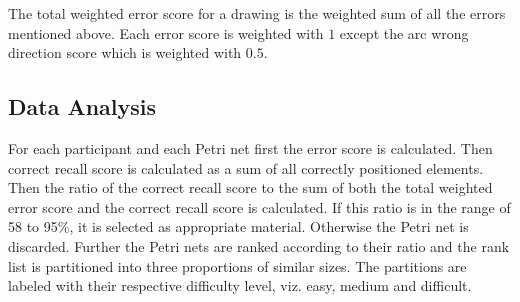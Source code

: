 The total weighted error score for a drawing is the weighted sum of all the errors mentioned above.
Each error score is weighted with $1$ except the arc wrong direction score which is weighted with $0.5$.

\subsection{Data Analysis}

For each participant and each Petri net first the error score is calculated.
Then correct recall score is calculated as a sum of all correctly positioned elements.
Then the ratio of the correct recall score to the sum of both the total weighted error score and the correct recall score is calculated.
If this ratio is in the range of 58 to 95\%, it is selected as appropriate material.
Otherwise the Petri net is discarded.
Further the Petri nets are ranked according to their ratio and the rank list is partitioned into three proportions of similar sizes.
The partitions are labeled with their respective difficulty level, viz. easy, medium and difficult.
